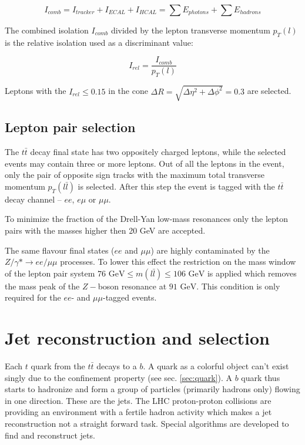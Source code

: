 \begin{equation}
 I_{comb} = I_{tracker} + I_{ECAL} + I_{HCAL} = \sum E_{photons} + \sum E_{hadrons}
\end{equation}

The combined isolation $I_{comb}$ divided by the lepton transverse momentum $p_{T}(l)$ is the relative isolation used as a discriminant value:

\begin{equation}
 I_{rel} = \frac{I_{comb}}{p_{T}(l)}
\end{equation}

Leptons with the $I_{rel} \leq 0.15$ in the cone $\Delta R = \sqrt{\Delta\eta^{2} + \Delta\phi^{2}} = 0.3$ are selected.

\subsection{Lepton pair selection}

The $t\bar{t}$ decay final state has two oppositely charged leptons, while the selected events may contain three or more leptons.
Out of all the leptons in the event, only the pair of opposite sign tracks with the maximum total transverse momentum $p_{T}(l\bar{l})$
is selected. After this step the event is tagged with the $t\bar{t}$ decay channel -- $ee$, $e\mu$ or $\mu\mu$.

To minimize the fraction of the Drell-Yan low-mass resonances only the lepton pairs with the masses higher then 20 GeV are accepted. 

The same flavour final states ($ee$ and $\mu\mu$) are highly contaminated by the $Z/\gamma * \to ee/\mu\mu$ processes. To lower this effect
the restriction on the mass window of the lepton pair system $\textrm{76 GeV} \leq m(l\bar{l}) \leq \textrm{106 GeV}$ is applied which removes  
the mass peak of the $Z-$boson resonance at $\textrm{91 GeV}$. This condition is only required for the $ee$- and $\mu\mu$-tagged events.


\section{Jet reconstruction and selection}

Each $t$ quark from the $t\bar{t}$ decays to a $b$. A quark as a colorful object can't exist singly due to the confinement property (see sec. \ref{sec:quark}).
A $b$ quark thus starts to hadronize and form a group of particles (primarily hadrons only) flowing in one direction. These are the jets. The LHC proton-proton collisions
are providing an environment with a fertile hadron activity which makes a jet reconstruction not a straight forward task. Special algorithms are developed
to find and reconstruct jets.

